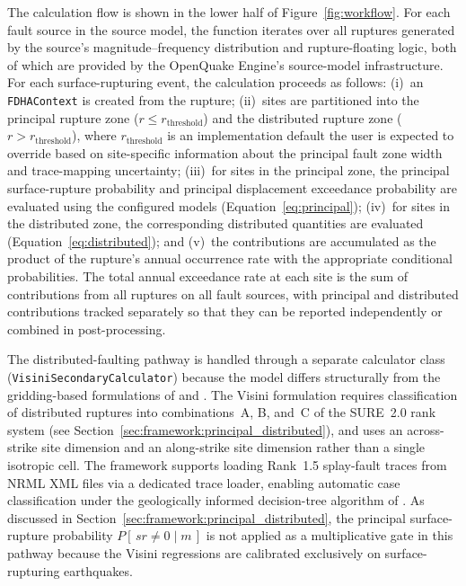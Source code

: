 The calculation flow is shown in the lower half of Figure~\ref{fig:workflow}. For each fault source in the source model, the function iterates over all ruptures generated by the source's magnitude--frequency distribution and rupture-floating logic, both of which are provided by the OpenQuake Engine's source-model infrastructure. For each surface-rupturing event, the calculation proceeds as follows: (i)~an \texttt{FDHAContext} is created from the rupture; (ii)~sites are partitioned into the principal rupture zone ($r \le r_{\mathrm{threshold}}$) and the distributed rupture zone ($r > r_{\mathrm{threshold}}$), where $r_{\mathrm{threshold}}$ is an implementation default the user is expected to override based on site-specific information about the principal fault zone width and trace-mapping uncertainty; (iii)~for sites in the principal zone, the principal surface-rupture probability and principal displacement exceedance probability are evaluated using the configured models (Equation~\ref{eq:principal}); (iv)~for sites in the distributed zone, the corresponding distributed quantities are evaluated (Equation~\ref{eq:distributed}); and (v)~the contributions are accumulated as the product of the rupture's annual occurrence rate with the appropriate conditional probabilities. The total annual exceedance rate at each site is the sum of contributions from all ruptures on all fault sources, with principal and distributed contributions tracked separately so that they can be reported independently or combined in post-processing.

The \citet{Visini2025} distributed-faulting pathway is handled through a separate calculator class (\texttt{VisiniSecondaryCalculator}) because the model differs structurally from the gridding-based formulations of \citet{youngs_methodology_2003} and \citet{Petersen2011}. The Visini formulation requires classification of distributed ruptures into combinations~A, B, and~C of the SURE~2.0 rank system (see Section~\ref{sec:framework:principal_distributed}), and uses an across-strike site dimension and an along-strike site dimension rather than a single isotropic cell. The framework supports loading Rank~1.5 splay-fault traces from NRML XML files via a dedicated trace loader, enabling automatic case classification under the geologically informed decision-tree algorithm of \citet[Figure~12]{Visini2025}. As discussed in Section~\ref{sec:framework:principal_distributed}, the principal surface-rupture probability $P[\,sr \neq 0 \mid m\,]$ is not applied as a multiplicative gate in this pathway because the Visini regressions are calibrated exclusively on surface-rupturing earthquakes.



